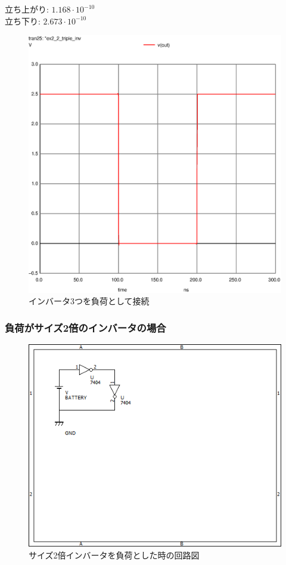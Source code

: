 \documentclass{jsarticle}
\begin{document}
\begin{flushleft}
    立ち上がり: $1.168 \cdot 10^{-10}$\\
    立ち下り: $2.673 \cdot 10^{-10}$
\end{flushleft}
\begin{figure}[H]
    \hspace{50pt}
    \includegraphics[scale=0.8]{ex2_2_triple_inv.ps}
    \vspace{30pt}
    \caption{インバータ3つを負荷として接続}
\end{figure}

\subsubsection{負荷がサイズ2倍のインバータの場合}
\begin{figure}[H]
    \centering
    \includegraphics[bb=0 0 500 400]{ex2_2_inv.png}
    \caption{サイズ2倍インバータを負荷とした時の回路図}
\end{figure}
\end{document}
